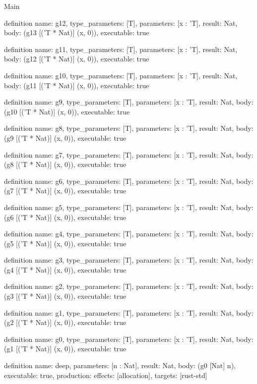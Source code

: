\begin{lexlean}{Main}
\begin{semanticmodule}
definition{
  name: g12,
  type_parameters: [T],
  parameters: [x : 'T],
  result: Nat,
  body: (g13 [('T * Nat)] (x, 0)),
  executable: true
}

definition{
  name: g11,
  type_parameters: [T],
  parameters: [x : 'T],
  result: Nat,
  body: (g12 [('T * Nat)] (x, 0)),
  executable: true
}

definition{
  name: g10,
  type_parameters: [T],
  parameters: [x : 'T],
  result: Nat,
  body: (g11 [('T * Nat)] (x, 0)),
  executable: true
}

definition{
  name: g9,
  type_parameters: [T],
  parameters: [x : 'T],
  result: Nat,
  body: (g10 [('T * Nat)] (x, 0)),
  executable: true
}

definition{
  name: g8,
  type_parameters: [T],
  parameters: [x : 'T],
  result: Nat,
  body: (g9 [('T * Nat)] (x, 0)),
  executable: true
}

definition{
  name: g7,
  type_parameters: [T],
  parameters: [x : 'T],
  result: Nat,
  body: (g8 [('T * Nat)] (x, 0)),
  executable: true
}

definition{
  name: g6,
  type_parameters: [T],
  parameters: [x : 'T],
  result: Nat,
  body: (g7 [('T * Nat)] (x, 0)),
  executable: true
}

definition{
  name: g5,
  type_parameters: [T],
  parameters: [x : 'T],
  result: Nat,
  body: (g6 [('T * Nat)] (x, 0)),
  executable: true
}

definition{
  name: g4,
  type_parameters: [T],
  parameters: [x : 'T],
  result: Nat,
  body: (g5 [('T * Nat)] (x, 0)),
  executable: true
}

definition{
  name: g3,
  type_parameters: [T],
  parameters: [x : 'T],
  result: Nat,
  body: (g4 [('T * Nat)] (x, 0)),
  executable: true
}

definition{
  name: g2,
  type_parameters: [T],
  parameters: [x : 'T],
  result: Nat,
  body: (g3 [('T * Nat)] (x, 0)),
  executable: true
}

definition{
  name: g1,
  type_parameters: [T],
  parameters: [x : 'T],
  result: Nat,
  body: (g2 [('T * Nat)] (x, 0)),
  executable: true
}

definition{
  name: g0,
  type_parameters: [T],
  parameters: [x : 'T],
  result: Nat,
  body: (g1 [('T * Nat)] (x, 0)),
  executable: true
}

definition{
  name: deep,
  parameters: [n : Nat],
  result: Nat,
  body: (g0 [Nat] n),
  executable: true,
  production: {effects: [allocation], targets: [rust-std]}
}
\end{semanticmodule}
\end{lexlean}
